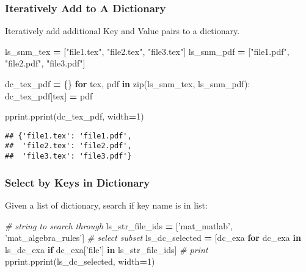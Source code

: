\documentclass[
]{book}
\newenvironment{Shaded}{\begin{snugshade}}{\end{snugshade}}
\newcommand{\BuiltInTok}[1]{#1}
\newcommand{\CommentTok}[1]{\textcolor[rgb]{0.56,0.35,0.01}{\textit{#1}}}
\newcommand{\ControlFlowTok}[1]{\textcolor[rgb]{0.13,0.29,0.53}{\textbf{#1}}}
\newcommand{\DecValTok}[1]{\textcolor[rgb]{0.00,0.00,0.81}{#1}}
\newcommand{\KeywordTok}[1]{\textcolor[rgb]{0.13,0.29,0.53}{\textbf{#1}}}
\newcommand{\NormalTok}[1]{#1}
\newcommand{\OperatorTok}[1]{\textcolor[rgb]{0.81,0.36,0.00}{\textbf{#1}}}
\newcommand{\StringTok}[1]{\textcolor[rgb]{0.31,0.60,0.02}{#1}}
\begin{document}
\hypertarget{iteratively-add-to-a-dictionary}{%
\subsubsection{Iteratively Add to A Dictionary}\label{iteratively-add-to-a-dictionary}}

Iteratively add additional Key and Value pairs to a dictionary.

\begin{Shaded}
\begin{Highlighting}[]
\NormalTok{ls_snm_tex }\OperatorTok{=}\NormalTok{ [}\StringTok{"file1.tex"}\NormalTok{, }\StringTok{"file2.tex"}\NormalTok{, }\StringTok{"file3.tex"}\NormalTok{]}
\NormalTok{ls_snm_pdf }\OperatorTok{=}\NormalTok{ [}\StringTok{"file1.pdf"}\NormalTok{, }\StringTok{"file2.pdf"}\NormalTok{, }\StringTok{"file3.pdf"}\NormalTok{]}

\NormalTok{dc_tex_pdf }\OperatorTok{=}\NormalTok{ \{\}}
\ControlFlowTok{for}\NormalTok{ tex, pdf }\KeywordTok{in} \BuiltInTok{zip}\NormalTok{(ls_snm_tex, ls_snm_pdf):}
\NormalTok{  dc_tex_pdf[tex] }\OperatorTok{=}\NormalTok{ pdf}

\NormalTok{pprint.pprint(dc_tex_pdf, width}\OperatorTok{=}\DecValTok{1}\NormalTok{)}
\end{Highlighting}
\end{Shaded}

\begin{verbatim}
## {'file1.tex': 'file1.pdf',
##  'file2.tex': 'file2.pdf',
##  'file3.tex': 'file3.pdf'}
\end{verbatim}

\hypertarget{select-by-keys-in-dictionary}{%
\subsubsection{Select by Keys in Dictionary}\label{select-by-keys-in-dictionary}}

Given a list of dictionary, search if key name is in list:

\begin{Shaded}
\begin{Highlighting}[]
\CommentTok{# string to search through}
\NormalTok{ls_str_file_ids }\OperatorTok{=}\NormalTok{ [}\StringTok{'mat_matlab'}\NormalTok{, }\StringTok{'mat_algebra_rules'}\NormalTok{]}
\CommentTok{# select subset}
\NormalTok{ls_dc_selected }\OperatorTok{=}\NormalTok{ [dc_exa}
                  \ControlFlowTok{for}\NormalTok{ dc_exa }\KeywordTok{in}\NormalTok{ ls_dc_exa}
                  \ControlFlowTok{if}\NormalTok{ dc_exa[}\StringTok{'file'}\NormalTok{] }\KeywordTok{in}\NormalTok{ ls_str_file_ids]}
\CommentTok{# print}
\NormalTok{pprint.pprint(ls_dc_selected, width}\OperatorTok{=}\DecValTok{1}\NormalTok{)}
\end{Highlighting}
\end{Shaded}
\end{document}
